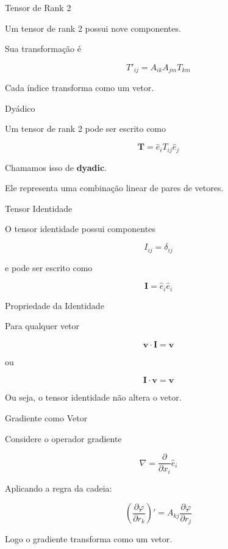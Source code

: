 \documentclass[aspectratio=169]{beamer}
\begin{document}
\begin{frame}{Tensor de Rank 2}

Um tensor de rank 2 possui nove componentes.

Sua transformação é

\[
T'_{ij}=A_{ik}A_{jm}T_{km}
\]

Cada índice transforma como um vetor.

\end{frame}

\begin{frame}{Dyádico}

Um tensor de rank 2 pode ser escrito como

\[
\mathbf T=\hat e_i T_{ij}\hat e_j
\]

Chamamos isso de \textbf{dyadic}.

Ele representa uma combinação linear de pares de vetores.

\end{frame}

\begin{frame}{Tensor Identidade}

O tensor identidade possui componentes

\[
I_{ij}=\delta_{ij}
\]

e pode ser escrito como

\[
\mathbf I=\hat e_i\hat e_i
\]

\end{frame}

\begin{frame}{Propriedade da Identidade}

Para qualquer vetor

\[
\mathbf v\cdot \mathbf I = \mathbf v
\]

ou

\[
\mathbf I \cdot \mathbf v = \mathbf v
\]

Ou seja, o tensor identidade não altera o vetor.

\end{frame}

\begin{frame}{Gradiente como Vetor}

Considere o operador gradiente

\[
\nabla = \frac{\partial}{\partial x_i}\hat e_i
\]

Aplicando a regra da cadeia:

\[
\left(\frac{\partial \varphi}{\partial r_k}\right)'
=
A_{kj}\frac{\partial\varphi}{\partial r_j}
\]

Logo o gradiente transforma como um vetor.

\end{frame}
\end{document}
